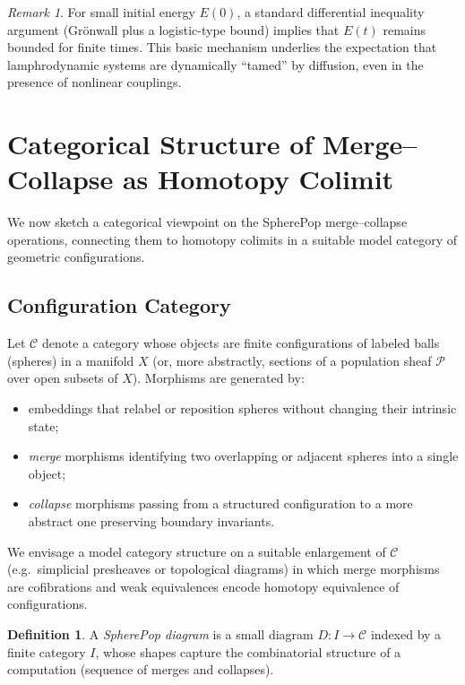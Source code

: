 \documentclass[12pt]{article}
\theoremstyle{plain}
\theoremstyle{definition}
\newtheorem{definition}[theorem]{Definition}
\theoremstyle{remark}
\newtheorem{remark}[theorem]{Remark}
\begin{document}
\begin{remark}
For small initial energy $E(0)$, a standard differential inequality argument
(Grönwall plus a logistic-type bound) implies that $E(t)$ remains bounded for
finite times. This basic mechanism underlies the expectation that lamphrodynamic
systems are dynamically ``tamed'' by diffusion, even in the presence of
nonlinear couplings.
\end{remark}


\section{Categorical Structure of Merge--Collapse as Homotopy Colimit}

We now sketch a categorical viewpoint on the SpherePop merge--collapse
operations, connecting them to homotopy colimits in a suitable model category
of geometric configurations.

\subsection{Configuration Category}

Let $\mathcal{C}$ denote a category whose objects are finite configurations
of labeled balls (spheres) in a manifold $X$ (or, more abstractly, sections
of a population sheaf $\mathcal{P}$ over open subsets of $X$). Morphisms are
generated by:

\begin{itemize}
    \item embeddings that relabel or reposition spheres without changing
          their intrinsic state;
    \item \emph{merge} morphisms identifying two overlapping or adjacent
          spheres into a single object;
    \item \emph{collapse} morphisms passing from a structured configuration
          to a more abstract one preserving boundary invariants.
\end{itemize}

We envisage a model category structure on a suitable enlargement of
$\mathcal{C}$ (e.g.\ simplicial presheaves or topological diagrams) in which
merge morphisms are cofibrations and weak equivalences encode homotopy
equivalence of configurations.

\begin{definition}
A \emph{SpherePop diagram} is a small diagram $D: I \to \mathcal{C}$ indexed
by a finite category $I$, whose shapes capture the combinatorial structure
of a computation (sequence of merges and collapses).
\end{definition}
\end{document}
